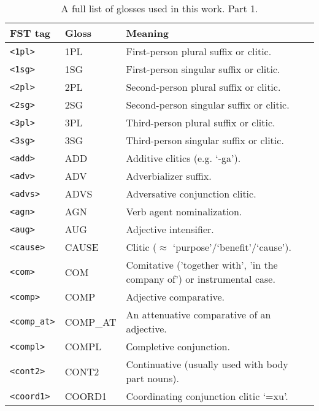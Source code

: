 
\begin{table}[!h]
    \begin{center}
        \caption{A full list of glosses used in this work. Part 1.}
        \label{Tab:glosses_1}
        \begin{tabular}{|p{4cm}|p{3cm}|p{8.5cm}|}
            \hline
            \textbf{FST tag} & \textbf{Gloss} & \textbf{Meaning} \\
            \hline
            \hline
            \texttt{<1pl>} & 1PL & First-person plural suffix or clitic. \\
            \texttt{<1sg>} & 1SG & First-person singular suffix or clitic. \\
            \texttt{<2pl>} & 2PL & Second-person plural suffix or clitic. \\
            \texttt{<2sg>} & 2SG & Second-person singular suffix or clitic.\\
            \texttt{<3pl>} & 3PL & Third-person plural suffix or clitic. \\
            \texttt{<3sg>} & 3SG & Third-person singular suffix or clitic.\\
            \texttt{<add>} & ADD & Additive clitics (e.g. `-ga').\\
            \texttt{<adv>} & ADV & Adverbializer suffix. \\
            \texttt{<advs>} & ADVS & Adversative conjunction clitic.\\
            \texttt{<agn>} & AGN & Verb agent nominalization. \\
            \texttt{<aug>} & AUG & Adjective intensifier. \\
            \texttt{<cause>} & CAUSE & Clitic ($\approx$ `purpose'/`benefit'/`cause').\\
            \texttt{<com>} & COM & Comitative ('together with', 'in the company of') or instrumental case. \\
            \texttt{<comp>} & COMP & Adjective comparative. \\
            \texttt{<comp\_at>} & COMP\_AT & An attenuative comparative of an adjective. \\
            \texttt{<compl>} & COMPL & Сompletive conjunction. \\
            \texttt{<cont2>} & CONT2 & Continuative (usually used with body part nouns).\\
            \texttt{<coord1>} & COORD1 & Coordinating conjunction clitic `=xu'. \\

\end{tabular}
\end{center}
\end{table}
